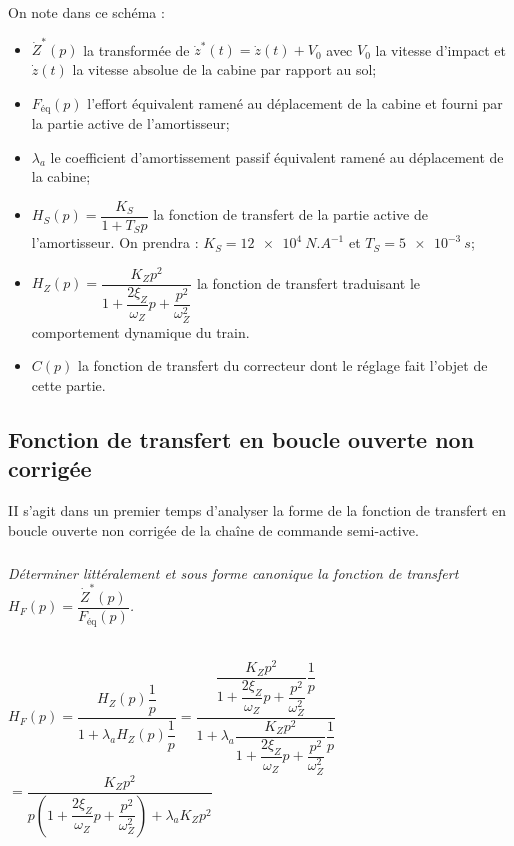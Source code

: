 \begin{multicols}{2}
\begin{multicols}{2}
On note dans ce schéma :
\begin{itemize}
\item $\dot{Z}^*(p)$ la transformée de $\dot{z}^*(t)=\dot{z}(t)+V_0$  avec $V_0$ la vitesse d'impact et $\dot{z}(t)$ la vitesse absolue de la cabine par rapport au sol;%
\item $F_{\text{éq}}(p)$  l'effort équivalent ramené au déplacement de la cabine et fourni par la partie active de l'amortisseur;%
\item $\lambda_a$ le coefficient d'amortissement passif équivalent ramené au déplacement de la cabine;
\item $H_S(p)=\dfrac{K_S}{1+T_Sp}$ la fonction de transfert de la partie active de l'amortisseur. %
On prendra : $K_S = \SI{12e4}{N.A^{-1}}$ et $T_S = \SI{5e-3}{s}$;
\item $H_Z(p)=\dfrac{K_Z p^2}{1+\dfrac{2\xi_Z}{\omega_Z}p+\dfrac{p^2}{\omega_Z^2}}$ la fonction de transfert traduisant le comportement dynamique du train.
\item $C(p)$ la fonction de transfert du correcteur dont le réglage fait l'objet de cette partie.
\end{itemize}
%
%
\fi


\subsection*{Fonction de transfert en boucle ouverte non corrigée}
\begin{obj}
II s'agit dans un premier temps d'analyser la forme de la fonction de transfert en boucle ouverte non corrigée de la chaîne de commande semi-active.
\end{obj}

\subparagraph{}\textit{Déterminer littéralement et sous forme canonique la fonction de transfert  $H_F(p)=\dfrac{\dot{Z}^*(p)}{F_{\text{éq}}(p)}$.}
\ifprof
\begin{corrige}~\\
$H_F(p) = \dfrac{H_Z(p)\dfrac{1}{p}}{1+\lambda_a H_Z(p)\dfrac{1}{p}}= \dfrac{\dfrac{K_Z p^2}{1+\dfrac{2\xi_Z}{\omega_Z}p+\dfrac{p^2}{\omega_Z^2}}\dfrac{1}{p}}{1+\lambda_a \dfrac{K_Z p^2}{1+\dfrac{2\xi_Z}{\omega_Z}p+\dfrac{p^2}{\omega_Z^2}}\dfrac{1}{p}}$
$= \dfrac{K_Z p^2}{p\left( 1+\dfrac{2\xi_Z}{\omega_Z}p+\dfrac{p^2}{\omega_Z^2} \right)+\lambda_a K_Z p^2}$


\end{corrige}
\end{multicols}
\end{multicols}
